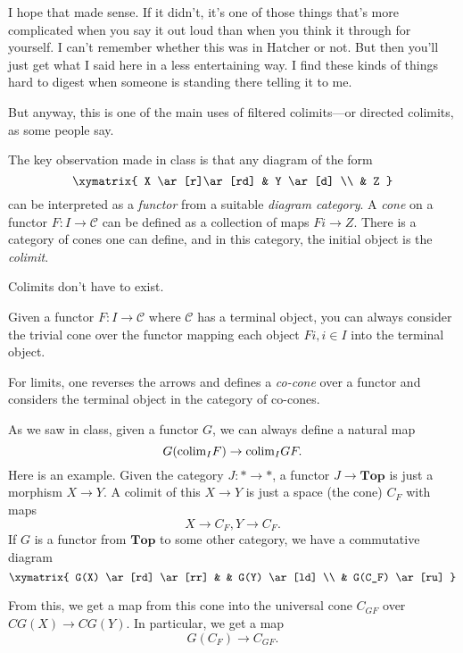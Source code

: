 I hope that made sense. If it didn't, it's one of those things that's more
complicated when you say it out loud than when you think it through for
yourself. I can't remember whether this was in Hatcher or not.
But then you'll just get what I said here in a less entertaining way. I find
these kinds of things hard to digest when someone is standing there telling it
to me. 

But anyway, this is one of the main uses of filtered colimits---or directed
colimits, as some people say.  


The key observation made in class is that any diagram of the form
\[ 
\xymatrix{
X \ar[r]\ar[rd] &  Y \ar[d]  \\ 
& Z
}
\]
can be interpreted as a \emph{functor} from a suitable \emph{diagram category}. 
A \emph{cone} on a functor $F: I \to \mathcal{C}$ can be defined as a
collection of maps $Fi \to Z$.  There is a category of cones one can define,
and in this category, the initial object is the \emph{colimit}.  

Colimits don't have to exist.  

\begin{remark} 
Given a functor $F: I \to \mathcal{C}$ where $\mathcal{C}$ has a terminal
object, you can always consider the trivial cone over the functor mapping each
object  $Fi, i \in I$ into the terminal object. 
\end{remark} 

For limits, one reverses the arrows and defines a \emph{co-cone} over a functor
and considers the terminal object in the category of co-cones.


As we saw in class, given a functor $G$, we can always define a natural map
\[ G(\mathrm{colim}_I F) \to \mathrm{colim}_I GF.  \]
Here is an example. Given the category $J: \ast \to \ast$, a functor $J \to
\mathbf{Top}$ is just a morphism $X \to Y$. A colimit of this $X \to Y$ is just
a space (the cone) $C_F$ with maps 
\[ X \to C_F, Y \to C_F.  \]
If $G$ is a functor from $\mathbf{Top}$ to some other category, we have a
commutative diagram
\[ \xymatrix{
G(X) \ar[rd] \ar[rr] &  &  G(Y) \ar[ld] \\
& G(C_F)  \ar[ru]
}\]
	
From this, we get a map from this cone into the universal cone $C_{GF}$ over
$CG(X) \to CG(Y)$. In particular, we get a map
\[ G(C_F) \to C_{GF}.  \]

